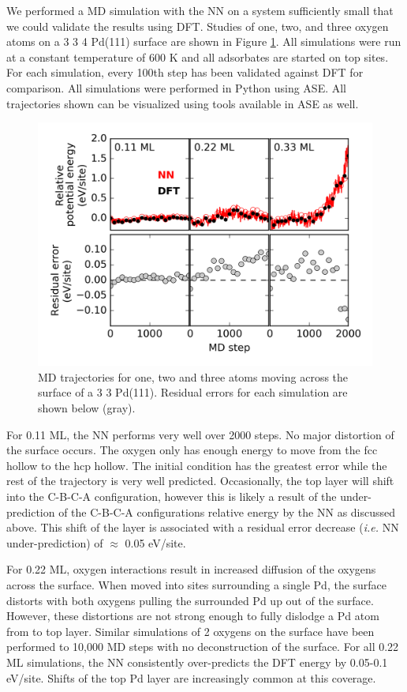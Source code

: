 \documentclass[12pt,oneside]{cmuthesis}
\begin{document}
We performed a MD simulation with the NN on a system sufficiently small that we could validate the results using DFT. Studies of one, two, and three oxygen atoms on a 3 \texttimes{} 3 \texttimes{} 4 Pd(111) surface are shown in Figure \ref{fig-PdO-MD}. All simulations were run at a constant temperature of 600 K and all adsorbates are started on top sites. For each simulation, every 100th step has been validated against DFT for comparison. All simulations were performed in Python using ASE. All trajectories shown can be visualized using tools available in ASE as well.

\begin{figure}[htbp]
\centering
\includegraphics[width=5.5in]{./images/PdO-MD.png}
\caption{\label{fig-PdO-MD}
MD trajectories for one, two and three atoms moving across the surface of a 3 \texttimes{} 3 Pd(111). Residual errors for each simulation are shown below (gray).}
\end{figure}
For 0.11 ML, the NN performs very well over 2000 steps. No major distortion of the surface occurs. The oxygen only has enough energy to move from the fcc hollow to the hcp hollow. The initial condition has the greatest error while the rest of the trajectory is very well predicted. Occasionally, the top layer will shift into the C-B-C-A configuration, however this is likely a result of the under-prediction of the C-B-C-A configurations relative energy by the NN as discussed above. This shift of the layer is associated with a residual error decrease (\emph{i.e.} NN under-prediction) of \(\approx\) 0.05 eV/site.

For 0.22 ML, oxygen interactions result in increased diffusion of the oxygens across the surface. When moved into sites surrounding a single Pd, the surface distorts with both oxygens pulling the surrounded Pd up out of the surface. However, these distortions are not strong enough to fully dislodge a Pd atom from to top layer. Similar simulations of 2 oxygens on the surface have been performed to 10,000 MD steps with no deconstruction of the surface. For all 0.22 ML simulations, the NN consistently over-predicts the DFT energy by 0.05-0.1 eV/site. Shifts of the top Pd layer are increasingly common at this coverage.
\end{document}
